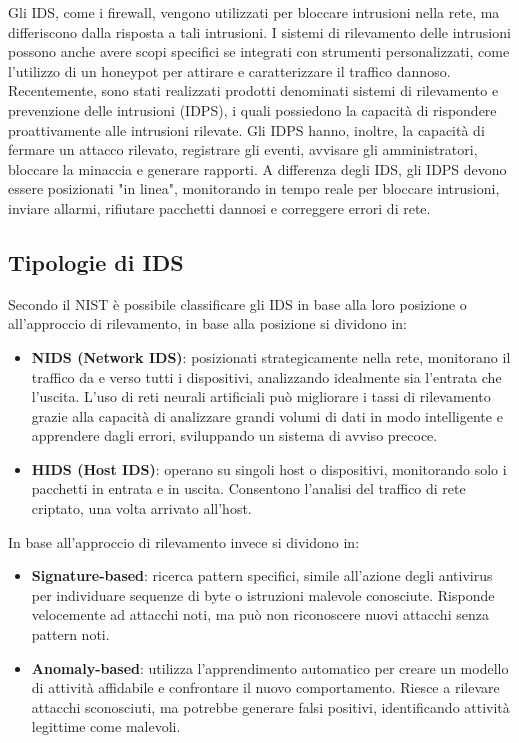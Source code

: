 Gli IDS, come i firewall, vengono utilizzati per bloccare intrusioni nella rete, ma differiscono dalla risposta a tali intrusioni. I sistemi di rilevamento delle intrusioni possono anche avere scopi specifici se integrati con strumenti personalizzati, come l'utilizzo di un honeypot per attirare e caratterizzare il traffico dannoso\cite{idsFirewall}.\\
Recentemente, sono stati realizzati prodotti denominati sistemi di rilevamento e prevenzione delle intrusioni (IDPS), i quali possiedono la capacità di rispondere proattivamente alle intrusioni rilevate. Gli IDPS hanno, inoltre, la capacità di fermare un attacco rilevato, registrare gli eventi, avvisare gli amministratori, bloccare la minaccia e generare rapporti. A differenza degli IDS, gli IDPS devono essere posizionati "in linea", monitorando in tempo reale per bloccare intrusioni, inviare allarmi, rifiutare pacchetti dannosi e correggere errori di rete\cite{idps}.\\


\subsection{Tipologie di IDS}
Secondo il NIST è possibile classificare gli IDS in base alla loro posizione o all'approccio di rilevamento, in base alla posizione si dividono in:
\begin{itemize}
	\item \textbf{NIDS (Network IDS)}: posizionati strategicamente nella rete, monitorano il traffico da e verso tutti i dispositivi, analizzando idealmente sia l'entrata che l'uscita. L'uso di reti neurali artificiali può migliorare i tassi di rilevamento grazie alla capacità di analizzare grandi volumi di dati in modo intelligente e apprendere dagli errori, sviluppando un sistema di avviso precoce\cite{taxonomy}.
	\item \textbf{HIDS (Host IDS)}: operano su singoli host o dispositivi, monitorando solo i pacchetti in entrata e in uscita. Consentono l'analisi del traffico di rete criptato, una volta arrivato all'host\cite{taxonomy}.
\end{itemize}
In base all'approccio di rilevamento invece si dividono in:
\begin{itemize}
	\item \textbf{Signature-based}: ricerca pattern specifici, simile all'azione degli antivirus per individuare sequenze di byte o istruzioni malevole conosciute. Risponde velocemente ad attacchi noti, ma può non riconoscere nuovi attacchi senza pattern noti\cite{signature}.
	\item \textbf{Anomaly-based}: utilizza l'apprendimento automatico per creare un modello di attività affidabile e confrontare il nuovo comportamento. Riesce a rilevare attacchi sconosciuti, ma potrebbe generare falsi positivi, identificando attività legittime come malevoli\cite{anomaly}.
\end{itemize}

